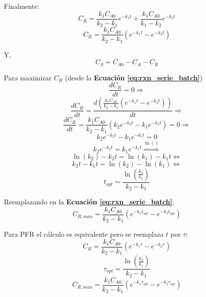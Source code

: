         Finalmente:
        \[C_{R} = \frac{k_{1} C_{A0}}{k_{2} - k_{1}} e^{-k_{1} t} + \frac{k_{1} C_{A0}}{k_{1} - k_{2}} e^{-k_{2}t}\]
        \begin{equation}
        \label{eq:rxn_serie_batch}
            C_{R} = \frac{k_{1} C_{A0}}{k_{2} - k_{1}} \left ( e^{-k_{1} t} - e^{-k_{2} t} \right )
        \end{equation}
        
        Y,
        \[C_{S} = C_{A0} - C_{A} - C_{R}\]
        
        Para maximizar \(C_{R}\) (desde la \textbf{Ecuación \ref{eq:rxn_serie_batch}})
        \[\frac{d{C}_{R}}{dt} = 0 \Rightarrow\]
        \[\frac{d{C_{R}}}{dt} = \frac{d \left ( \frac{k_{1} C_{A0}}{k_{2} - k_{1}} \left ( e^{-k_{1} t} - e^{-k_{2} t} \right ) \right )}{dt} \Rightarrow\]
        \[\frac{d{C_{R}}}{dt} = \frac{k_{1} C_{A0}}{k_{2} - k_{1}} \left ( k_{2} e^{-k_{2}t} - k_{1} e^{-k_{1}t} \right ) = 0 \Rightarrow\]
        \[k_{2} e^{-k_{2}t} - k_{1} e^{-k_{1}t} = 0\]
        \[k_{2} e^{-k_{2}t} = k_{1} e^{-k_{1}t} \overset{\ln()}{\Rightarrow}\]
        \[\ln(k_{2}) - k_{2}t = \ln(k_{1}) - k_{1}t \Leftrightarrow\]
        \[k_{2}t - k_{1}t = \ln(k_{2}) - \ln(k_{1}) \Leftrightarrow\]
        \begin{equation}
        \label{eq:rxn_serie_batch_t_opt}
            t_{opt} = \frac{\ln(\frac{k_{2}}{k_{1}})}{k_{2} - k_{1}}
        \end{equation}
        
        Reemplazando en la \textbf{Ecuación \ref{eq:rxn_serie_batch}}:
        \begin{equation}
        \label{eq:rxn_serie_barch_opt}
            C_{R,max} = \frac{k_{1} C_{A0}}{k_{2} - k_{1}} \left ( e^{-k_{1} t_{opt}} - e^{-k_{2} t_{opt}} \right )
        \end{equation}
        
        Para PFR el cálculo es equivalente pero se reemplaza \(t\) por \(\tau\):
        \begin{equation}
        \label{eq:rxn_serie_pfr}
            C_{R} = \frac{k_{1} C_{A0}}{k_{2} - k_{1}} \left ( e^{-k_{1} \tau} - e^{-k_{2} \tau} \right )
        \end{equation}
        \begin{equation}
        \label{eq:rxn_serie_pfr_t_opt}
            \tau_{opt} = \frac{\ln(\frac{k_{2}}{k_{1}})}{k_{2} - k_{1}}
        \end{equation}
        \begin{equation}
        \label{eq:rxn_serie_pfr_opt}
            C_{R,max} = \frac{k_{1} C_{A0}}{k_{2} - k_{1}} \left ( e^{-k_{1} \tau_{opt}} - e^{-k_{2} \tau_{opt}} \right )
        \end{equation}
        
